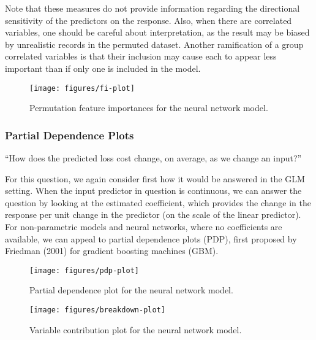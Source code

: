 \documentclass[preprint, 3p, twocolumn, letterpaper, 10pt]{elsarticle} %
\begin{document}
Note that these measures do not provide information regarding the directional
sensitivity of the predictors on the response. Also, when there are correlated
variables, one should be careful about interpretation, as the result may be
biased by unrealistic records in the permuted dataset. Another ramification
of a group correlated variables is that their inclusion may cause each to
appear less important than if only one is included in the model.

\begin{figure}

{\centering \texttt{[image: figures/fi-plot]} 

}

\caption{Permutation feature importances for the neural network model.}\label{fig:fi}
\end{figure}

\hypertarget{partial-dependence-plots}{%
\subsubsection{Partial Dependence Plots}\label{partial-dependence-plots}}

``How does the predicted loss cost change, on average, as we change an input?''

For this question, we again consider first how it would be answered in the GLM
setting. When the input predictor in question is continuous, we can answer the
question by looking at the estimated coefficient, which provides the change in
the response per unit change in the predictor (on the scale of the linear
predictor). For non-parametric models and neural networks, where no coefficients
are available, we can appeal to partial dependence plots (PDP), first proposed
by Friedman (2001) for gradient boosting machines (GBM).

\begin{figure*}[h]

{\centering \texttt{[image: figures/pdp-plot]} 

}

\caption{Partial dependence plot for the neural network model.}\label{fig:pdp}
\end{figure*}

\begin{figure*}[h]

{\centering \texttt{[image: figures/breakdown-plot]} 

}

\caption{Variable contribution plot for the neural network model.}\label{fig:breakdown}
\end{figure*}
\end{document}
